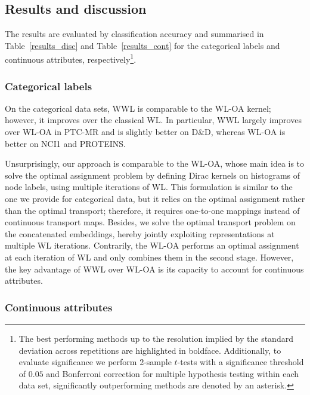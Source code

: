 \documentclass{article}
\begin{document}
\subsection{Results and discussion}
\label{sec:resdisc}

The results are evaluated by classification accuracy and summarised in Table~\ref{results_disc} and Table~\ref{results_cont} for the categorical labels and continuous attributes, respectively\footnote{
The best performing methods up to the resolution implied by the standard deviation across repetitions are highlighted in boldface. Additionally, to evaluate significance we perform 2-sample $t$-tests with a significance threshold of $0.05$ and Bonferroni correction for multiple hypothesis testing within each data set, significantly outperforming methods are denoted by an asterisk.}.

\subsubsection{Categorical labels}

On the categorical data sets, WWL is comparable to the WL-OA kernel; however, it improves over the classical WL. In particular, WWL largely improves over WL-OA in \textsc{PTC-MR} and is slightly better on \textsc{D\&D}, whereas WL-OA is better on \textsc{NCI1} and \textsc{PROTEINS}. 

Unsurprisingly,  our approach is comparable to the WL-OA, whose main idea is to solve the optimal assignment problem by defining Dirac kernels on histograms of node labels, using multiple iterations of WL. 
This formulation is similar to the one we provide for categorical data, but it relies on the optimal assignment rather than the optimal transport; therefore, it requires one-to-one mappings instead of continuous transport maps. Besides, we solve the optimal transport problem on the concatenated embeddings, hereby jointly exploiting representations at multiple WL iterations. Contrarily, the WL-OA performs an optimal assignment at each iteration of WL and only combines them in the second stage.
However, the key advantage of WWL over WL-OA is its capacity to account for continuous attributes.

\subsubsection{Continuous attributes}
\end{document}
